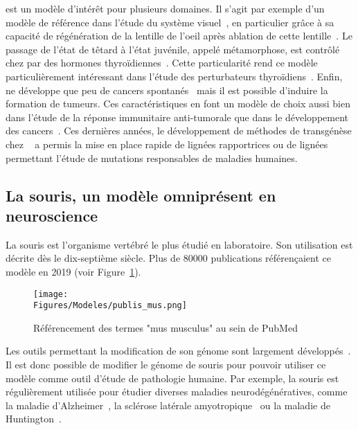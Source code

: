 \documentclass[\main/main.tex]{subfiles}
\begin{document}
%
\xl{} est un modèle d'intérêt pour plusieurs domaines.
%
Il s'agit par exemple d'un modèle de référence dans l'étude du système visuel~\cite{viet_2020,Rahman_2020,kha_2020},
en particulier grâce à sa capacité de régénération de la lentille de l'oeil après ablation de cette lentille~\cite{henry_2019}.
%
Le passage de l'état de têtard à l'état juvénile, appelé métamorphose, est contrôlé chez \xl{} par des hormones thyroïdiennes~\cite{brown_1996,furlow_2006}.
%
Cette particularité rend ce modèle particulièrement intéressant dans l'étude des perturbateurs thyroïdiens~\cite{li_2019,li_2019a,Couderq_2020}.
%
Enfin, \xl{} ne développe que peu de cancers spontanés~\cite{ruben_2007} mais il est possible d'induire la formation de tumeurs. Ces caractéristiques en font un modèle de choix aussi bien dans l'étude de la réponse immunitaire anti-tumorale que dans le développement des cancers~\cite{hardwick_2015}.
%
 Ces dernières années, le développement de méthodes de transgénèse chez \xl{}~\cite{tandon_2017} a permis la mise en place rapide de lignées rapportrices ou de lignées permettant l'étude de mutations responsables de maladies humaines.

    \subsection{La souris, un modèle omniprésent en neuroscience}

La souris est l'organisme vertébré le plus étudié en laboratoire.
%
Son utilisation  est décrite dès le dix-septième siècle.
%
Plus de 80000 publications référençaient ce modèle en 2019 (voir Figure~\ref{fig:model:mm:stats}).

\begin{figure}[htbp]{\textwidth} 
    \centering
       \centering \texttt{[image: \\Figures/Modeles/publis\_mus.png]}
       \caption{
            \label{fig:model:mm:stats}Référencement des termes "mus musculus" au sein de PubMed
            }
\end{figure}

%
Les outils permettant la modification de son génome sont largement développés~\cite{lanigan_2020}.
%
Il est donc possible de modifier le génome de souris pour pouvoir utiliser ce modèle comme outil d'étude de pathologie humaine.
%
Par exemple, la souris est régulièrement utilisée pour étudier diverses maladies neurodégénératives,
comme la maladie d'Alzheimer~\cite{han_2020,thadathil_2020,shin_2020},
la sclérose latérale amyotropique~\cite{Ahmed_2020,konopka_2020,mcleod_2020}
ou la maladie de Huntington~\cite{deng_2020,dridi_2020,pfister_2020}.
\end{document}
